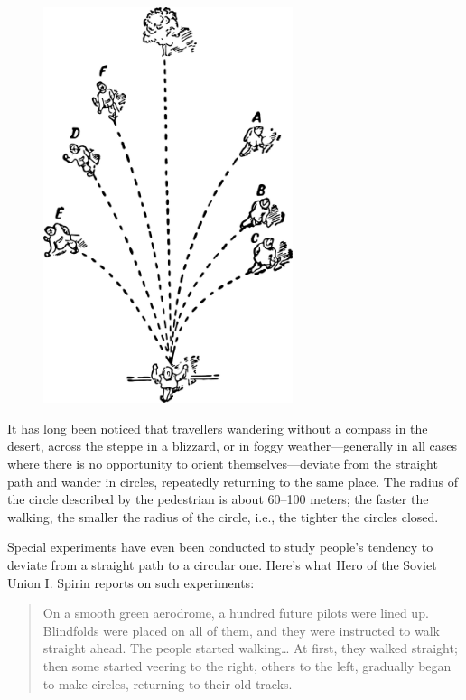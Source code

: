 \begin{figure}[h!]
\centering
\includegraphics[width=0.65\textwidth]{figures/ch-08/fig-111.pdf}
\end{figure}

It has long been noticed that travellers wandering without a compass in the desert, across the steppe in a blizzard, or in foggy weather—generally in all cases where there is no opportunity to orient themselves—deviate from the straight path and wander in circles, repeatedly returning to the same place. The radius of the circle described by the pedestrian is about 60–100 meters; the faster the walking, the smaller the radius of the circle, i.e., the tighter the circles closed.

Special experiments have even been conducted to study people's tendency to deviate from a straight path to a circular one. Here's what Hero of the Soviet Union I. Spirin reports on such experiments:
\begin{quote}
On a smooth green aerodrome, a hundred future pilots were lined up. Blindfolds were placed on all of them, and they were instructed to walk straight ahead. The people started walking\dots{} At first, they walked straight; then some started veering to the right, others to the left, gradually began to make circles, returning to their old tracks.
\end{quote}

